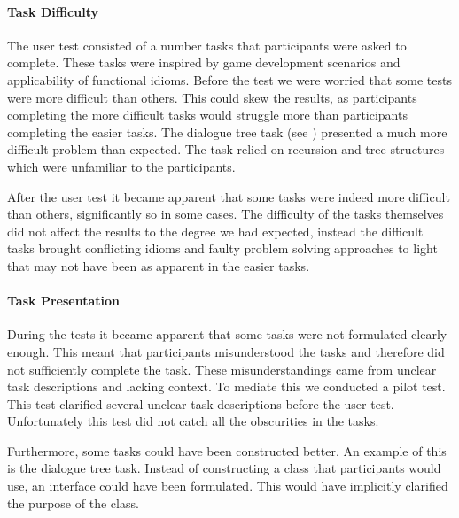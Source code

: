 \paragraph{Task Difficulty}
The user test consisted of a number tasks that participants were asked to complete. These tasks were inspired by game development scenarios and applicability of functional idioms. Before the test we were worried that some tests were more difficult than others. This could skew the results, as participants completing the more difficult tasks would struggle more than participants completing the easier tasks. The dialogue tree task (see ) presented a much more difficult problem than expected. The task relied on recursion and tree structures which were unfamiliar to the participants.

After the user test it became apparent that some tasks were indeed more difficult than others, significantly so in some cases. The difficulty of the tasks themselves did not affect the results to the degree we had expected, instead the difficult tasks brought conflicting idioms and faulty problem solving approaches to light that may not have been as apparent in the easier tasks.

\paragraph{Task Presentation}
During the tests it became apparent that some tasks were not formulated clearly enough. This meant that participants misunderstood the tasks and therefore did not sufficiently complete the task. These misunderstandings came from unclear task descriptions and lacking context. To mediate this we conducted a pilot test. This test clarified several unclear task descriptions before the user test. Unfortunately this test did not catch all the obscurities in the tasks.

Furthermore, some tasks could have been constructed better. An example of this is the dialogue tree task. Instead of constructing a class that participants would use, an interface could have been formulated. This would have implicitly clarified the purpose of the class. 

